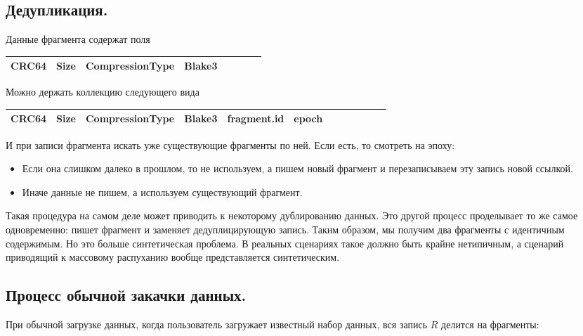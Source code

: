 \documentclass[a4paper,12pt]{article}
\begin{document}
\subsection{Дедупликация.}

Данные фрагмента содержат поля

\begin{center}
\begin{tabular}{|Sl|Sc|Sc|Sr|}
    \hline
    CRC64 & Size & CompressionType & Blake3 \\
    \hline
\end{tabular}
\end{center}

\bigskip
Можно держать коллекцию следующего вида

\begin{center}
\begin{tabular}{|Sl|Sc|Sc|Sc|Sc|Sr|}
    \hline
    CRC64 & Size & CompressionType & Blake3 & fragment.id & epoch \\
    \hline
\end{tabular}
\end{center}

\bigskip
И при записи фрагмента искать уже существующие фрагменты по ней. Если есть, то смотреть на эпоху:

\begin{itemize}
\item Если она слишком далеко в прошлом, то не используем, а пишем новый фрагмент и перезаписываем эту запись новой ссылкой.
\item Иначе данные не пишем, а используем существующий фрагмент.
\end{itemize}

Такая процедура на самом деле может приводить к некоторому дублированию данных. Это другой процесс проделывает то же самое одновременно: пишет
фрагмент и заменяет дедуплицирующую запись. Таким образом, мы получим два фрагменты с идентичным содержимым. Но это больше синтетическая
проблема. В реальных сценариях такое должно быть крайне нетипичным, а сценарий приводящий к массовому распуханию вообще представляется синтетическим.

\subsection{Процесс обычной закачки данных.}

При обычной загрузке данных, когда пользователь загружает известный набор данных, вся запись $R$ делится на фрагменты:
\end{document}
